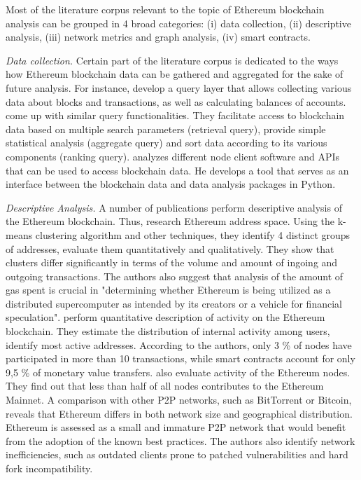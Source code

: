 Most of the literature corpus relevant to the topic of Ethereum blockchain analysis can be grouped in 4 broad categories: (i) data collection, (ii) descriptive analysis, (iii) network metrics and graph analysis, (iv) smart contracts.

\textit{Data collection.} Certain part of the literature corpus is dedicated to the ways how Ethereum blockchain data can be gathered and aggregated for the sake of future analysis. For instance, 
\cite{li2017etherql} develop a query layer that allows collecting various data about blocks and transactions, as well as calculating balances of accounts.
\cite{pratama2018query} come up with similar query functionalities.
They facilitate access to blockchain data based on multiple search parameters (retrieval query), provide simple statistical analysis (aggregate query) and sort data according to its various components (ranking query).
\cite{perezanalysis} analyzes different node client software and APIs that can be used to access blockchain data.
He develops a tool that serves as an interface between the blockchain data and data analysis packages in Python.



\textit{Descriptive Analysis.} A number of publications perform descriptive analysis of the Ethereum blockchain.
Thus, \cite{payette2017characterizing} research Ethereum address space. 
Using the k-means clustering algorithm and other techniques, they identify 4 distinct groups of addresses, evaluate them quantitatively and qualitatively.
They show that clusters differ significantly in terms of the volume and amount of ingoing and outgoing transactions.
The authors also suggest that analysis of the amount of gas spent is crucial in "determining whether Ethereum is being utilized as a distributed supercomputer as intended by its creators or a vehicle for financial speculation".
\cite{anoaica2018quantitative} perform quantitative description of activity on the Ethereum blockchain. 
They 
estimate the distribution of internal activity among users, identify most active addresses.
According to the authors, only 3 \% of nodes have participated in more than 10 transactions, while smart contracts account for only 9,5 \% of monetary value transfers.
\cite{kim2018measuring} also evaluate activity of the Ethereum nodes. 
They find out that less than half of all nodes contributes to the Ethereum Mainnet. 
A comparison with other P2P networks, such as BitTorrent or Bitcoin, reveals that Ethereum differs in both network size and geographical distribution. 
Ethereum is assessed as a small and immature P2P network that would benefit from the adoption of the known best practices.
The authors also identify network inefficiencies, such as outdated clients prone to patched vulnerabilities and hard fork incompatibility.

